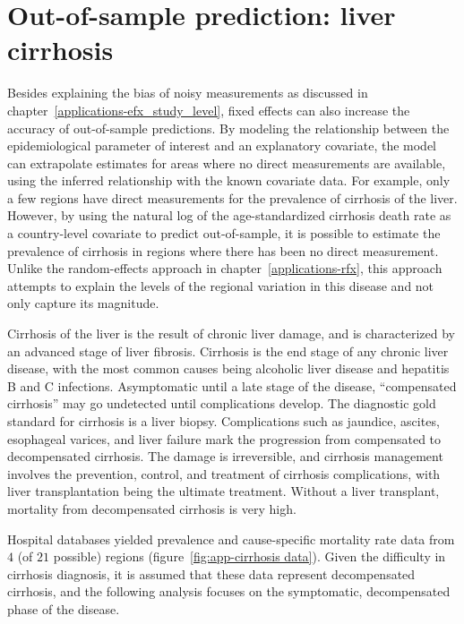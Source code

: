 \chapter{Out-of-sample prediction: liver cirrhosis}
\label{applications-efx_country_level}

Besides explaining the bias of noisy measurements as discussed in
chapter~\ref{applications-efx_study_level}, fixed effects can also
increase the accuracy of out-of-sample predictions.  By modeling the
relationship between the epidemiological parameter of interest and an
explanatory covariate, the model can extrapolate estimates for areas
where no direct measurements are available, using the inferred
relationship with the known covariate data.  For example, only a few
regions have direct measurements for the prevalence of cirrhosis of
the liver.  However, by using the natural log of the age-standardized
cirrhosis death rate as a country-level covariate to predict
out-of-sample, it is possible to estimate the prevalence of cirrhosis
in regions where there has been no direct measurement.  Unlike the
random-effects approach in chapter~\ref{applications-rfx}, this
approach attempts to explain the levels of the regional variation in
this disease and not only capture its magnitude.

Cirrhosis of the liver is the result of chronic liver damage, and is 
characterized by an advanced stage of liver fibrosis.  Cirrhosis is
the end stage of any chronic liver disease, with the most common
causes being alcoholic liver disease and hepatitis B and C infections.
Asymptomatic until a late stage of the disease, ``compensated
cirrhosis'' may go undetected until complications develop.  The
diagnostic gold standard for cirrhosis is a liver biopsy.
Complications such as jaundice, ascites, esophageal varices, 
and liver failure mark the progression
from compensated to decompensated cirrhosis.  The damage is irreversible, and cirrhosis
management involves the prevention, control, and treatment of cirrhosis
complications, with liver transplantation being the ultimate
treatment.  Without a liver transplant, mortality from decompensated
cirrhosis is very high. \cite{garcia-tsao_management_2009,
  damico_natural_2006, schuppan_liver_2008}

Hospital databases yielded prevalence and cause-specific mortality rate
data from $4$ (of $21$ possible) regions (figure~\ref{fig:app-cirrhosis data}).
Given the difficulty in
cirrhosis diagnosis, it is assumed that these data represent decompensated
cirrhosis, and the following analysis focuses on the symptomatic, 
decompensated phase of the disease.


